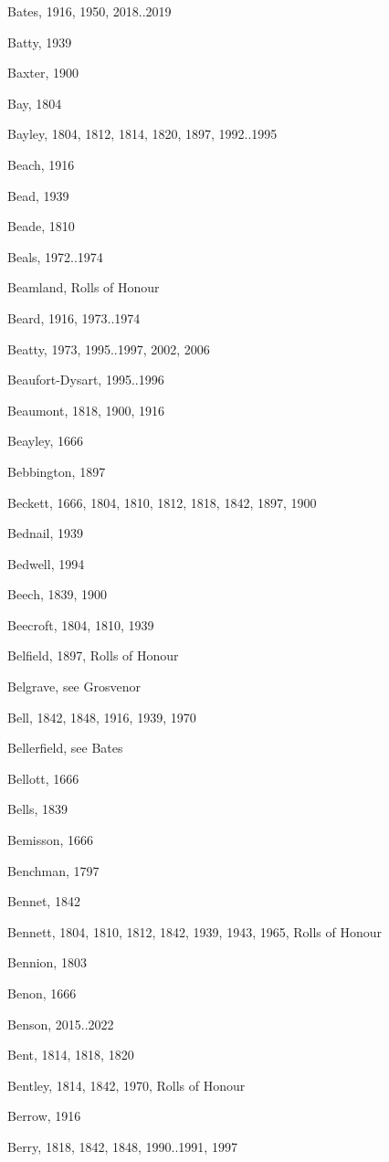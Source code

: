 {\begin{theindex}
\item Bates, 1916, 1950, 2018..2019
\item Batty, 1939
\item Baxter, 1900
\item Bay, 1804
\item Bayley, 1804, 1812, 1814, 1820, 1897, 1992..1995
\item Beach, 1916
\item Bead, 1939
\item Beade, 1810
\item Beals, 1972..1974
\item Beamland, Rolls of Honour
\item Beard, 1916, 1973..1974
\item Beatty, 1973, 1995..1997, 2002, 2006
\item Beaufort-Dysart, 1995..1996
\item Beaumont, 1818, 1900, 1916
\item Beayley, 1666
\item Bebbington, 1897
\item Beckett, 1666, 1804, 1810, 1812, 1818, 1842, 1897, 1900
\item Bednail, 1939
\item Bedwell, 1994
\item Beech, 1839, 1900
\item Beecroft, 1804, 1810, 1939
\item Belfield, 1897, Rolls of Honour
\item Belgrave, see Grosvenor
\item Bell, 1842, 1848, 1916, 1939, 1970
\item Bellerfield, see Bates
\item Bellott, 1666
\item Bells, 1839
\item Bemisson, 1666
\item Benchman, 1797
\item Bennet, 1842
\item Bennett, 1804, 1810, 1812, 1842, 1939, 1943, 1965, Rolls of Honour
\item Bennion, 1803
\item Benon, 1666
\item Benson, 2015..2022
\item Bent, 1814, 1818, 1820
\item Bentley, 1814, 1842, 1970, Rolls of Honour
\item Berrow, 1916
\item Berry, 1818, 1842, 1848, 1990..1991, 1997

\end{theindex}}

